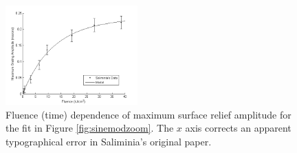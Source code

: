 \documentclass[twocolumn,showpacs,preprintnumbers,amsmath,amssymb]{revtex4}
\begin{document}
\begin{figure}
                                                                                                                                                                                                                                                                                                                                                                                                                                                                                                                                                                                                                                                                                                                                                                                                                                                                                                                                                                                                                                                                  \includegraphics[width=2in]{figure/saliminiagrowth.png}
                                                                                                                                                                                                                                                                                                                                                                                                                                                                                                                                                                                                                                                                                                                                                                                                                                                                                                                                                                                                                                                                \caption{Fluence (time) dependence of maximum surface relief amplitude for the fit in Figure \ref{fig:sinemodzoom}. The $x$ axis corrects an apparent typographical error in Saliminia's original paper.}

\end{figure}
\end{document}
